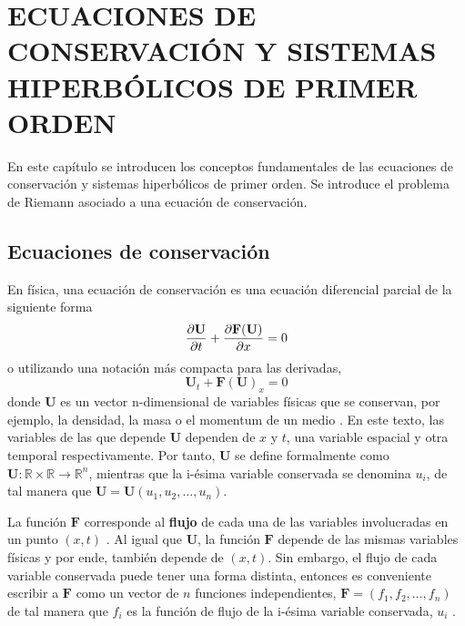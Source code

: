 \chapter{ECUACIONES DE CONSERVACIÓN Y SISTEMAS HIPERBÓLICOS DE PRIMER ORDEN}
En este capítulo se introducen los conceptos fundamentales de las ecuaciones de conservación y sistemas hiperbólicos de primer orden. Se introduce el problema de Riemann asociado a una ecuación de conservación.
\section{Ecuaciones de conservación}
\label{sec:ecuaciones-de-conservacion}
En física, una ecuación de conservación es una ecuación diferencial parcial de la siguiente forma
\begin{equation}
	\pdv{\mathbf{U}}{t} + \pdv{\mathbf{F}(\mathbf{U})}{x} = 0
	\label{eq:conservacion}
\end{equation}
o utilizando una notación más compacta para las derivadas,
\begin{equation}
	\mathbf{U}_{t} + \mathbf{F}(\mathbf{U})_{x} = 0
	\label{eq:conserv-deriv-short}
\end{equation}
donde $\mathbf{U}$ es un vector n-dimensional de variables físicas que se conservan, por ejemplo, la densidad, la masa o el momentum de un medio \cite{Leveque}. En este texto, las variables de las que depende $\mathbf{U}$ dependen de $x$ y $t$, una variable espacial y otra temporal respectivamente. Por tanto, $\mathbf{U}$ se define formalmente como $\mathbf{U} : \mathbb{R} \times  \mathbb{R} \rightarrow \mathbb{R}^{n}$, mientras que la i-ésima variable conservada se denomina $u_{i}$, de tal manera que $\mathbf{U} = \mathbf{U}(u_{1}, u_{2}, \dots, u_{n})$\hspace{2mm}\cite{Leveque}. 

La función $\mathbf{F}$ corresponde al \textbf{flujo} de cada una de las variables involucradas en un punto $(x,t)$ \cite{Leveque}. Al igual que $\mathbf{U}$, la función $\mathbf{F}$ depende de las mismas variables físicas y por ende, también depende de $(x,t)$. Sin embargo, el flujo de cada variable conservada puede tener una forma distinta, entonces es conveniente escribir a $\mathbf{F}$ como un vector de $n$ funciones independientes, $\mathbf{F} = (f_{1}, f_{2}, \dots, f_{n})$
de tal manera que $f_i$ es la función de flujo de la i-ésima variable conservada, $u_i$ \cite{Leveque}.

